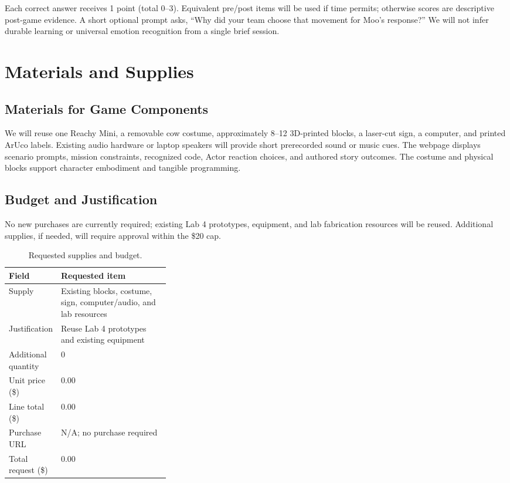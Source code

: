 \documentclass[conference,12pt,letterpaper]{IEEEtran}
\begin{document}
Each correct answer receives 1 point (total 0--3). Equivalent pre/post items will be used if time permits; otherwise scores are descriptive post-game evidence. A short optional prompt asks, ``Why did your team choose that movement for Moo's response?'' We will not infer durable learning or universal emotion recognition from a single brief session.

\section{Materials and Supplies}
\subsection{Materials for Game Components}
We will reuse one Reachy Mini, a removable cow costume, approximately 8--12 3D-printed blocks, a laser-cut sign, a computer, and printed ArUco labels. Existing audio hardware or laptop speakers will provide short prerecorded sound or music cues. The webpage displays scenario prompts, mission constraints, recognized code, Actor reaction choices, and authored story outcomes. The costume and physical blocks support character embodiment and tangible programming.

\subsection{Budget and Justification}
No new purchases are currently required; existing Lab 4 prototypes, equipment, and lab fabrication resources will be reused. Additional supplies, if needed, will require approval within the \$20 cap.
\begin{table}[H]
\centering
\caption{Requested supplies and budget.}
\label{tab:budget}
\begin{tabularx}{\linewidth}{@{}p{0.32\linewidth}Y@{}}
\hline
\textbf{Field} & \textbf{Requested item}\\
\hline
Supply & Existing blocks, costume, sign, computer/audio, and lab resources\\
Justification & Reuse Lab 4 prototypes and existing equipment\\
Additional quantity & 0\\
Unit price (\$) & 0.00\\
Line total (\$) & 0.00\\
Purchase URL & N/A; no purchase required\\
\hline
Total request (\$) & 0.00\\
\hline
\end{tabularx}
\end{table}
\end{document}
